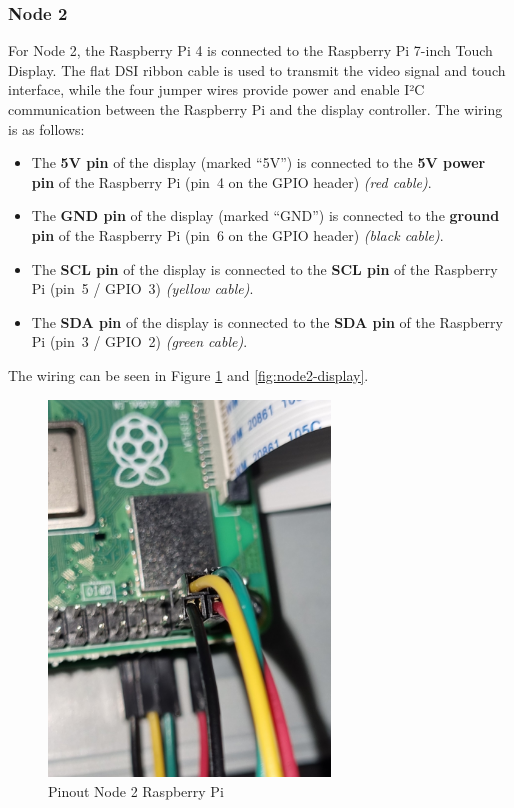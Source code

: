 \subsubsection{Node 2}

For Node 2, the Raspberry Pi 4 is connected to the Raspberry Pi 7-inch Touch Display.  
The flat DSI ribbon cable is used to transmit the video signal and touch interface, while the four jumper wires provide power and enable I²C communication between the Raspberry Pi and the display controller. The wiring is as follows:

\begin{itemize}
    \item The \textbf{5V pin} of the display (marked ``5V'') is connected to the \textbf{5V power pin} of the Raspberry Pi (pin~4 on the GPIO header) \emph{(red cable)}.
    \item The \textbf{GND pin} of the display (marked ``GND'') is connected to the \textbf{ground pin} of the Raspberry Pi (pin~6 on the GPIO header) \emph{(black cable)}.
    \item The \textbf{SCL pin} of the display is connected to the \textbf{SCL pin} of the Raspberry Pi (pin~5 / GPIO~3) \emph{(yellow cable)}.
    \item The \textbf{SDA pin} of the display is connected to the \textbf{SDA pin} of the Raspberry Pi (pin~3 / GPIO~2) \emph{(green cable)}.
\end{itemize}

The wiring can be seen in Figure \ref{fig:node2-raspy} and \ref{fig:node2-display}.

\begin{figure}[h]
	\includegraphics[height=100mm]{images/node2-raspy.jpg}
	\centering
	\caption{Pinout Node 2 Raspberry Pi}
	\label{fig:node2-raspy}
\end{figure}

